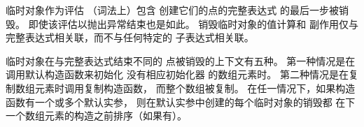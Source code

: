 \pnum
{}%
%
%
临时对象作为评估
（词法上）包含
创建它们的点的完整表达式 的最后一步被销毁。
即使该评估以抛出异常结束也是如此。
%
销毁临时对象的值计算和
%
副作用仅与完整表达式相关联，而不与任何特定的
子表达式相关联。

\pnum
{}%
%
临时对象在与完整表达式结束不同的
点被销毁的上下文有五种。
第一种情况是在调用默认构造函数来初始化
没有相应初始化器 的数组元素时。
第二种情况是在复制数组元素时调用复制构造函数，
而整个数组被复制。
在任一情况下，如果构造函数有一个或多个默认实参，
则在默认实参中创建的每个临时对象的销毁都
在下一个数组元素的构造之前排序（如果有）。

